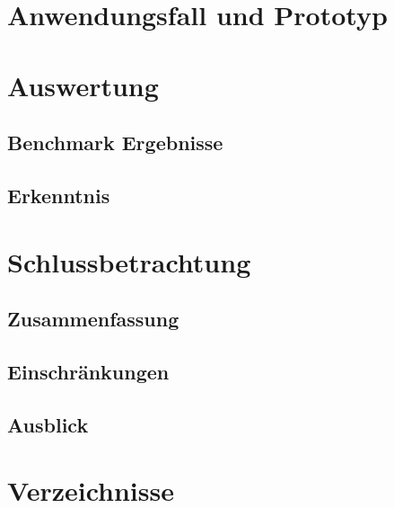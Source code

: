 \documentclass[11pt, a4paper]{book}
\begin{document}
\pagestyle{fancy}


\cleardoublepage


\frontmatter



\mainmatter







\chapter{Anwendungsfall und Prototyp}

\chapter{Auswertung}
\section{Benchmark Ergebnisse}
\section{Erkenntnis}

\chapter{Schlussbetrachtung}
\section{Zusammenfassung}
\section{Einschränkungen}
\section{Ausblick}




\chapter{Verzeichnisse}
\end{document}
